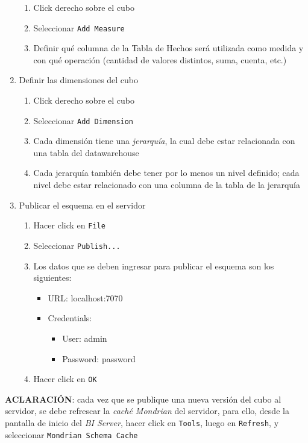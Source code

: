 \begin{enumerate}
    \begin{enumerate}
        \item Click derecho sobre el cubo
        \item Seleccionar \texttt{Add Measure}
        \item Definir qué columna de la Tabla de Hechos será utilizada como medida y con qué operación (cantidad de valores distintos, suma, cuenta, etc.)
    \end{enumerate}
    \item Definir las dimensiones del cubo
    \begin{enumerate}
        \item Click derecho sobre el cubo
        \item Seleccionar \texttt{Add Dimension}
        \item Cada dimensión tiene una \emph{jerarquía}, la cual debe estar relacionada con una tabla del datawarehouse 
        \item Cada jerarquía también debe tener por lo menos un nivel definido; cada nivel debe estar relacionado con una columna de la tabla de la jerarquía
    \end{enumerate}
    \item Publicar el esquema en el servidor
    \begin{enumerate}
        \item Hacer click en \texttt{File}
        \item Seleccionar \texttt{Publish...}
        \item Los datos que se deben ingresar para publicar el esquema son los siguientes:
        \begin{itemize}
            \item URL: localhost:7070
            \item Credentials:
                \begin{itemize}
                    \item User: admin
                    \item Password: password
                \end{itemize}
        \end{itemize}
        \item Hacer click en \texttt{OK}
    \end{enumerate}
\end{enumerate}

\begin{displayquote}
    \textbf{ACLARACIÓN}: cada vez que se publique una nueva versión del cubo al servidor, se debe refrescar la \emph{caché Mondrian} del servidor, para ello, desde la pantalla de inicio del \emph{BI Server}, hacer click en \texttt{Tools}, luego en \texttt{Refresh}, y seleccionar \texttt{Mondrian Schema Cache}     
\end{displayquote}

